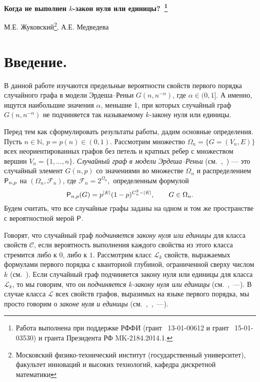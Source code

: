 \documentclass[12pt,a4paper,russian,titlepage]{article}
\begin{document}
\centerline{\bf{\large Когда не выполнен $k$-закон нуля или единицы?~\footnote{Работа выполнена при поддержке РФФИ (грант \No~13-01-00612 и грант \No~15-01-03530) и гранта Президента РФ MK-2184.2014.1.}}}
\vspace{0.5cm}
\centerline{{\large М.Е. Жуковский\footnote{Московский физико-технический институт (государственный университет), факультет инноваций и высоких технологий, кафедра дискретной математики}, А.Е. Медведева}}

\vspace{1cm}
\section {Введение.}

В данной работе изучаются предельные вероятности свойств первого порядка случайного графа в модели Эрдеша--Реньи $G(n,n^{-\alpha})$, где $\alpha\in(0,1]$. А именно, ищутся наибольшие значения $\alpha$, меньшие 1, при которых случайный граф $G(n,n^{-\alpha})$ не подчиняется так называемому $k$-закону нуля или единицы.

Перед тем как сформулировать результаты работы, дадим основные определения.
Пусть $n\in\mathbb{N}$, $p=p(n)\in(0,1)$. Рассмотрим множество $\Omega_n=\{G=(V_n,E)\}$ всех неориентированных графов без петель и кратных ребер с множеством вершин $V_n=\{1,...,n\}$. \emph{ Случайный граф в модели Эрдеша--Реньи} (см.~\cite{Janson},~\cite{Uspekhi}) --- это случайный элемент $G(n,p)$ со значениями во множестве $\Omega_n$ и распределением ${\sf P}_{n,p}$ на $(\Omega_n,\mathcal{F}_n)$, где
$\mathcal{F}_n=2^{\Omega_n},$ определенным формулой
$$
 {\sf P}_{n,p}(G)=p^{|E|}(1-p)^{C_n^2-|E|}, \quad\quad G\in\Omega_n.
$$
Будем считать, что все случайные графы заданы на одном и том же пространстве с вероятностной мерой ${\sf P}$.


Говорят, что случайный граф {\it подчиняется закону нуля или единицы} для класса свойств $\mathcal{C}$, если вероятность выполнения каждого свойства из этого класса стремится либо к $0$, либо к $1$. Рассмотрим класс $\mathcal{L}_k$ свойств, выражаемых формулами первого порядка с кванторной глубиной, ограниченной сверху числом $k$ (см.~\cite{Veresh}). Если случайный граф подчиняется закону нуля или единицы для
класса $\mathcal{L}_k$, то мы говорим, что он {\it подчиняется $k$-закону нуля или единицы} (см.~\cite{Uspekhi},~\cite{Zhuk_dan}---\cite{Zhuk_second}). В случае класса $\mathcal{L}$ всех свойств графов, выразимых на языке первого порядка, мы просто говорим о {\it законе нуля и единицы} (см.~\cite{Janson},~\cite{Uspekhi},~\cite{Shelah}---\cite{Fagin}).
\end{document}
